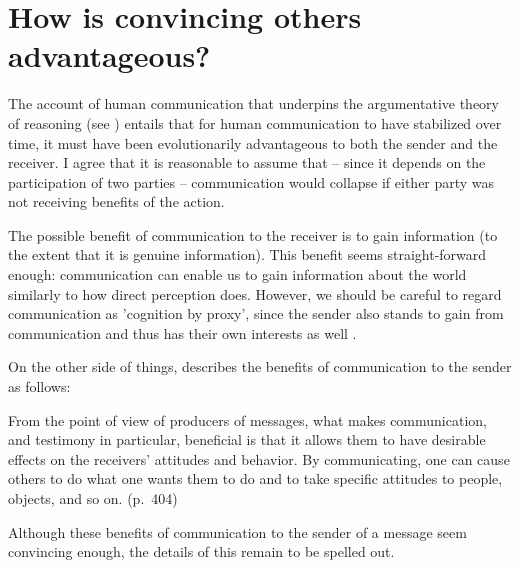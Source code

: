 
\section{How is convincing others advantageous?}

The account of human communication that underpins the argumentative theory of reasoning (see \citet{Sperber01, Sperber10})
entails that for human communication to have stabilized over time, it must have been evolutionarily advantageous to both the sender and the receiver. I agree that it is reasonable to assume that -- since it depends on the participation of two parties -- communication would collapse if either party was not receiving benefits of the action.

The possible benefit of communication to the receiver is to gain information (to the extent that it is genuine information).
This benefit seems straight-forward enough: communication can enable us to gain information about the world similarly to how direct perception does. However, we should be careful to regard communication as 'cognition by proxy', since the sender also stands to gain from communication and thus has their own interests as well \citep{Sperber01}.

On the other side of things, \citet{Sperber01} describes the benefits of communication to the sender as follows:
\begin{quoting}
    From the point of view of producers of messages, what makes communication, and testimony in particular, beneficial is that it allows them to have desirable effects on the receivers' attitudes and behavior. By communicating, one can cause others to do what one wants them to do and to take specific attitudes to people, objects, and so on.
    \hfill (p.~404)
\end{quoting}
Although these benefits of communication to the sender of a message seem convincing enough, the details of this remain to be spelled out.


